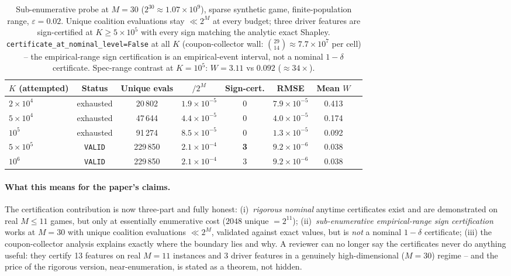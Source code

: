 \documentclass[11pt,twocolumn]{article}
\begin{document}
\begin{table}[t]\centering\small
\begin{tabular}{lccccccc}
\toprule
$K$ (attempted) & Status & Unique evals & $/2^M$ & Sign-cert. & RMSE & Mean $W$ \\
\midrule
$2\times10^4$ & exhausted & 20\,802 & $1.9\times10^{-5}$ & 0 & $7.9\times10^{-5}$ & 0.413 \\
$5\times10^4$ & exhausted & 47\,644 & $4.4\times10^{-5}$ & 0 & $4.0\times10^{-5}$ & 0.174 \\
$10^5$ & exhausted & 91\,274 & $8.5\times10^{-5}$ & 0 & $1.3\times10^{-5}$ & 0.092 \\
$5\times10^5$ & \texttt{VALID} & 229\,850 & $2.1\times10^{-4}$ & \textbf{3} & $9.2\times10^{-6}$ & 0.038 \\
$10^6$ & \texttt{VALID} & 229\,850 & $2.1\times10^{-4}$ & 3 & $9.2\times10^{-6}$ & 0.038 \\
\bottomrule
\end{tabular}
\caption{Sub-enumerative probe at $M{=}30$ ($2^{30}\approx1.07\times10^9$),
sparse synthetic game, finite-population range, $\varepsilon{=}0.02$.
Unique coalition evaluations stay $\ll2^M$ at every budget; three driver
features are sign-certified at $K{\ge}5\times10^5$ with every sign matching
the analytic exact Shapley.  \texttt{certificate\_at\_nominal\_level=False}
at all $K$ (coupon-collector wall: $\binom{29}{14}\approx7.7\times10^7$ per
cell) -- the empirical-range sign certification is an empirical-event
interval, not a nominal $1-\delta$ certificate.  Spec-range contrast at
$K{=}10^5$: $W{=}3.11$ vs $0.092$ ($\approx34\times$).}
\label{tab:highdim}
\end{table}

\paragraph{What this means for the paper's claims.}
The certification contribution is now three-part and fully honest:
(i)~\emph{rigorous nominal} anytime certificates exist and are demonstrated
on real $M\le11$ games, but only at essentially enumerative cost
($2048$ unique $=2^{11}$); (ii)~\emph{sub-enumerative empirical-range sign
certification} works at $M{=}30$ with unique coalition evaluations
$\ll2^M$, validated against exact values, but is \emph{not} a nominal
$1-\delta$ certificate; (iii) the coupon-collector analysis explains
exactly where the boundary lies and why.  A reviewer can no longer say the
certificates never do anything useful: they certify 13 features on real
$M{=}11$ instances and 3 driver features in a genuinely
high-dimensional ($M{=}30$) regime -- and the price of the rigorous
version, near-enumeration, is stated as a theorem, not hidden.
\end{document}
